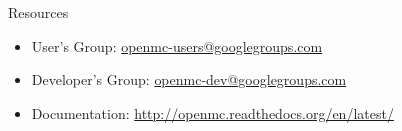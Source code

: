 \documentclass[noamssymb,svgnames]{beamer}
\begin{document}
\begin{frame}{Resources}
  \begin{itemize}
  \item User's Group: \url{openmc-users@googlegroups.com}
  \item Developer's Group: \url{openmc-dev@googlegroups.com}
  \item Documentation: \url{http://openmc.readthedocs.org/en/latest/}
  \end{itemize}
\end{frame}
\end{document}
